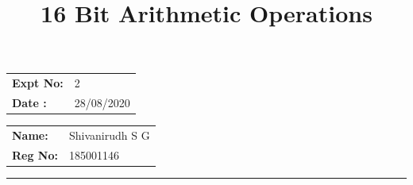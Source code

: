 \documentclass[12pt,a4paper]{article}
\title{\bf 16 Bit Arithmetic Operations}
\author{\vspace{-10ex}}
\date{\vspace{-10ex}}
\begin{document}
\maketitle

\begin{minipage}{0.45\textwidth}
        \begin{tabular}{l l}
            \textbf{Expt No:}&2\\
            \textbf{Date :}&28/08/2020
        \end{tabular}
\end{minipage}%
\begin{minipage}{0.45\textwidth}
        \begin{tabular}{l l}
             \textbf{Name:}& Shivanirudh S G  \\
             \textbf{Reg No:} & 185001146 
        \end{tabular}
\end{minipage}
\vspace{1cm}
\hrule
\end{document}
